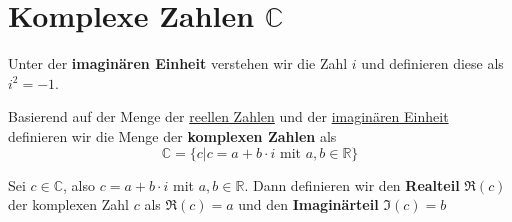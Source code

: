 \documentclass[../../main.tex]{subfiles}
\begin{document}
		
		
		\section{Komplexe Zahlen $\mathbb{C}$}
			\begin{definition}
				\label{def:imaginäreEinheit}
				Unter der \textbf{imaginären Einheit} verstehen wir die Zahl $i$ und definieren diese als $i^2 = -1$. 
			\end{definition}
		
			\begin{definition}
				\label{def:KomplexeZahlen}
				Basierend auf der Menge der \hyperref[def:ReelleZahlen]{reellen Zahlen} und der \hyperref[def:imaginäreEinheit]{imaginären Einheit} definieren wir die Menge der \textbf{komplexen Zahlen} als $$\mathbb{C} = \{c | c = a + b \cdot i \text{ mit } a,b \in \mathbb{R} \}$$
			\end{definition}
		
			\begin{definition}
				\label{def:Realteil}
				\label{def:Imaginärteil}
				Sei $c \in \mathbb{C}$, also $c = a+b \cdot i$ mit $a,b \in \mathbb{R}$. Dann definieren wir den \textbf{Realteil} $\mathfrak{R}(c)$ der komplexen Zahl $c$ als $\mathfrak{R}(c) = a$ und den \textbf{Imaginärteil} $\mathfrak{I}(c)=b$
			\end{definition}
	
\end{document}
